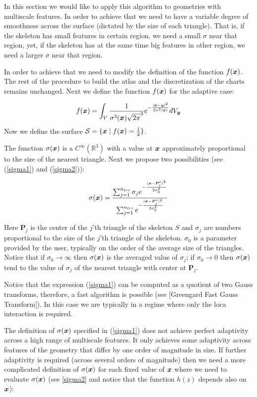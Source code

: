 \documentclass[11pt]{article}
\numberwithin{equation}{section}
\newcommand{\vct}{\vectorsym}
\newcommand\bx{\vct{x}}
\newcommand\by{\vct{y}}
\newcommand\bP{\boldsymbol P}
\begin{document}
In this section we would like to apply this algorithm to geometries with multiscale features. In order to achieve that we need to have a variable degree of smoothness across the surface (dictated by the size of each triangle). That is, if the skeleton has small features in certain region, we need a small $\sigma$ near that region, yet, if the skeleton has at the same time big features in other region, we need a larger $\sigma$ near that region.

In order to achieve that we need to modify the definition of the function $f(\bx)$. The rest of the procedure to build the atlas and the discretization of the charts remains unchanged. Next we define the function $f(\bx)$ for the adaptive case:

\begin{equation}
f(\bx)=\int_{V}\frac{1}{\sigma ^3(\bx)\sqrt{2\pi}^3}e^{-\frac{|\bx-\by|^2}{2\sigma^2(\bx)}}dV_{\by}
\end{equation}
Now we define the surface $\mathcal{S}=\{\bx \mid f(\bx)=\frac{1}{2}\}$.

The function $\sigma(\bx)$ is a $C^{\infty}(\mathbb{R}^3)$ with a value at $\bx$ approximately proportional to the size of the nearest triangle. Next we propose two possibilities (see (\ref{sigma1}) and (\ref{sigma2})):

\begin{equation}\label{sigma1}
\sigma(\bx)=\frac{\sum_{j=1}^{n_{tri}}\sigma_je^{- \frac{|\bx-\bP_j^c|^2}{2\sigma^2_0}}}{\sum_{j=1}^{n_{tri}}e^{-\frac{|\bx-\bP_j^c|^2}{2\sigma^2_0}}}
\end{equation}

Here $\bP_j$ is the center of the $j$'th triangle of the skeleton $\mathit{S}$ and $\sigma_j$ are numbers proportional to the size of the $j$'th triangle of the skeleton. $\sigma_0$ is a parameter provided by the user, typically on the order of the average size of the triangles. Notice that if $\sigma_0\rightarrow \infty$ then $\sigma(\bx)$ is the averaged value of $\sigma_j$; if $\sigma_0\rightarrow 0$ then $\sigma(\bx)$ tend to the value of $\sigma_j$ of the nearest triangle with center at $\bP_j$.

Notice that the expression (\ref{sigma1}) can be computed as a quotient of two Gauss transforms, therefore, a fast algorithm is possible (see [Greengard Fast Gauss Transform]). In this case we are typically in a regime where only the loca interaction is required.

The definition of $\sigma(\bx)$ specified in (\ref{sigma1}) does not achieve perfect adaptivity across a high range of multiscale features. It only achieves some adaptivity across features of the geometry that differ by one order of magnitude in size. If further adaptivity is required (across several orders of magnitude) then we need a more complicated definition of $\sigma(\bx)$ for each fixed value of $\bx$ where we need to evaluate $\sigma(\bx)$ (see \ref{sigma2} and notice that the function $h(z)$ depends also on $\bx$):
\end{document}
